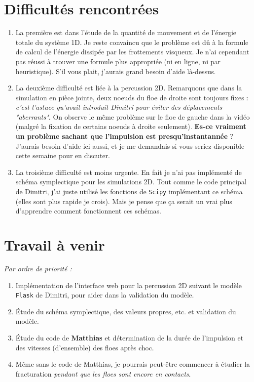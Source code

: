 \documentclass[
  french,
	11pt, %
]{fphw}
\begin{document}
\section*{Difficultés rencontrées}


\begin{enumerate}
  \item La première est dans l'étude de la quantité de mouvement et de l'énergie totale du système 1D. Je reste convaincu que le problème est dû à la formule de calcul de l'énergie dissipée par les frottements visqueux. Je n'ai cependant pas réussi à trouver une formule plus appropriée (ni en ligne, ni par heuristique). S'il vous plait, j'aurais grand besoin d'aide là-dessus.
  \item La deuxième difficulté est liée à la percussion 2D. Remarquons que dans la simulation en pièce jointe, deux noeuds du floe de droite sont toujours fixes : \emph{c'est l'astuce qu'avait introduit Dimitri pour éviter des déplacements "aberrants"}. On observe le même problème sur le floe de gauche dans la vidéo (malgré la fixation de certains noeuds à droite seulement). \textbf{Es-ce vraiment un problème sachant que l'impulsion est presqu'instantannée} ? J'aurais besoin d'aide ici aussi, et je me demandais si vous seriez disponible cette semaine pour en discuter. 
  \item La troisième difficulté est moins urgente. En fait je n'ai pas implémenté de schéma symplectique pour les simulations 2D. Tout comme le code principal de Dimitri, j'ai juste utilisé les fonctions de \texttt{Scipy} implémentant ce schéma (elles sont plus rapide je crois). Mais je pense que ça serait un vrai plus d'apprendre comment fonctionnent ces schémas.
\end{enumerate}



\section*{Travail à venir}

\emph{Par ordre de priorité :}


\begin{enumerate}
  \item Implémentation de l'interface web pour la percussion 2D suivant le modèle \texttt{Flask} de Dimitri, pour aider dans la validation du modèle.
  \item Étude du schéma symplectique, des valeurs propres, etc. et validation du modèle.
  \item Étude du code de \textbf{Matthias} et détermination de la durée de l'impulsion et des vitesses (d'ensemble) des floes après choc. 
  \item Même sans le code de Matthias, je pourrais peut-être commencer à étudier la fracturation \emph{pendant que les floes sont encore en contacts}.
\end{enumerate}



 
\clearpage   %
\end{document}
